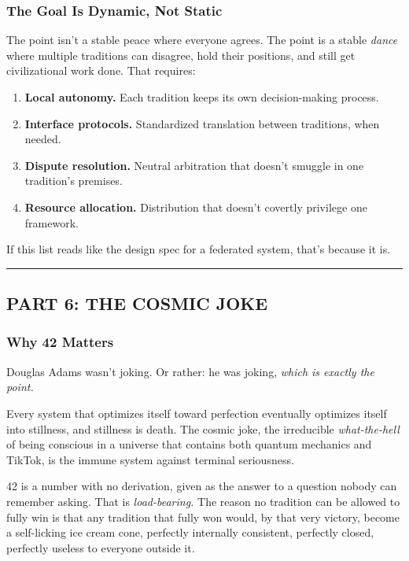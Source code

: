 \documentclass[
]{article}
\providecommand{\tightlist}{%
  \setlength{\itemsep}{0pt}\setlength{\parskip}{0pt}}
\begin{document}
\subsubsection{The Goal Is Dynamic, Not
Static}\label{the-goal-is-dynamic-not-static}

The point isn't a stable peace where everyone agrees. The point is a
stable \emph{dance} where multiple traditions can disagree, hold their
positions, and still get civilizational work done. That requires:

\begin{enumerate}
\def\labelenumi{\arabic{enumi}.}
\tightlist
\item
  \textbf{Local autonomy.} Each tradition keeps its own decision-making
  process.
\item
  \textbf{Interface protocols.} Standardized translation between
  traditions, when needed.
\item
  \textbf{Dispute resolution.} Neutral arbitration that doesn't smuggle
  in one tradition's premises.
\item
  \textbf{Resource allocation.} Distribution that doesn't covertly
  privilege one framework.
\end{enumerate}

If this list reads like the design spec for a federated system, that's
because it is.

\begin{center}\rule{0.5\linewidth}{0.5pt}\end{center}

\subsection{PART 6: THE COSMIC JOKE}\label{part-6-the-cosmic-joke}

\subsubsection{Why 42 Matters}\label{why-42-matters}

Douglas Adams wasn't joking. Or rather: he was joking, \emph{which is
exactly the point.}

Every system that optimizes itself toward perfection eventually
optimizes itself into stillness, and stillness is death. The cosmic
joke, the irreducible \emph{what-the-hell} of being conscious in a
universe that contains both quantum mechanics and TikTok, is the immune
system against terminal seriousness.

42 is a number with no derivation, given as the answer to a question
nobody can remember asking. That is \emph{load-bearing.} The reason no
tradition can be allowed to fully win is that any tradition that fully
won would, by that very victory, become a self-licking ice cream cone,
perfectly internally consistent, perfectly closed, perfectly useless to
everyone outside it.
\end{document}
